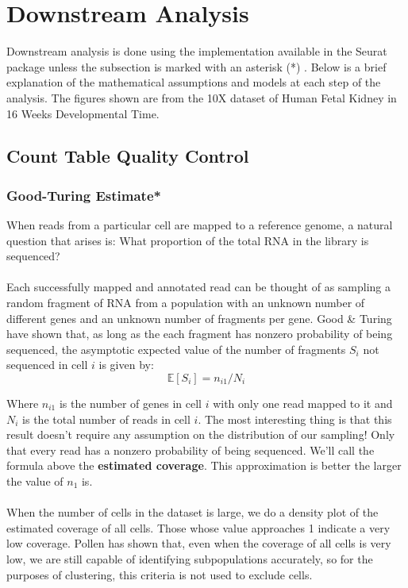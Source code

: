 \newpage
\section{Downstream Analysis}

Downstream analysis is done using the implementation available in the Seurat\cite{satija2015spatial} package unless the subsection is marked with an asterisk (*) . Below is a brief explanation of the mathematical assumptions and models at each step of the analysis. The figures shown are from the 10X dataset of Human Fetal Kidney in 16 Weeks Developmental Time. 

\subsection{Count Table Quality Control}
\subsubsection{Good-Turing Estimate*}
When reads from a particular cell are mapped to a reference genome, a natural question that arises is: What proportion of the total RNA in the library is sequenced? \\
\\
Each successfully mapped and annotated read can be thought of as sampling a random fragment of RNA from a population with an unknown number of different genes and an unknown number of fragments per gene. Good \& Turing \cite{good1953population} have shown that, as long as the each fragment has nonzero probability of being sequenced, the asymptotic expected value of the number of fragments $S_i$ not sequenced in cell $i$ is given by:
$$
\mathbb{E}[S_i] = n_{i1} / N_i
$$

Where $n_{i1}$ is the number of genes in cell $i$ with only one read mapped to it and $N_i$ is the total number of reads in cell $i$. The most interesting thing is that this result doesn't require any assumption on the distribution of our sampling! Only that every read has a nonzero probability of being sequenced. We'll call the formula above the \textbf{estimated coverage}. This approximation is better the larger the value of $n_1$ is. \\
\\
When the number of cells in the dataset is large, we do a density plot of the estimated coverage of all cells. Those whose value approaches 1 indicate a very low coverage. Pollen \cite{pollen2014low} has shown that, even when the coverage of all cells is very low, we are still capable of identifying subpopulations accurately, so for the purposes of clustering, this criteria is not used to exclude cells.

